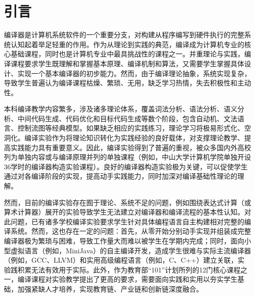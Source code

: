 \documentclass{SCIS2020cn}
\begin{document}
\maketitle

\section{引言}
编译器是计算机系统软件的一个重要分支，对构建从程序编写到硬件执行的完整系统认知起着举足轻重的作用。作为从理论到实践的典范，编译成为计算机专业的核心基础课程，同时也是计算机专业中最具挑战性的课程之一。并重理论与实践，编译课程要求学生既理解和掌握基本原理、编译机制和算法，又需要学生掌握具体设计、实现一个基本编译器的初步能力。然而，由于编译理论抽象，系统实现复杂，导致学生普遍认为编译课程枯燥、繁琐、无用，缺乏学习热情，失去积极性和主动性。

本科编译教学内容繁多，涉及诸多理论体系，覆盖词法分析、语法分析、语义分析、中间代码生成、代码优化和目标代码生成等数个阶段，包含自动机、文法语言、控制流图等经典模型。如果缺乏相应的实践练习，理论学习将极易形式化、空洞化。编译实验作为将理论知识转化为实践经验的良好载体，对支撑理论教学、提高实践能力具有重要意义。因此，编译实验得到了普遍的重视，被众多国内外高校列为单独内容或与编译原理并列的单独课程（例如，中山大学计算机学院单独开设36学时的编译器构造实验课程）。良好的编译器构造实验极为关键，可以促使学生通过对各编译阶段的实现，提高动手实践能力，同时加深对编译基础性理论的理解。

然而，目前的编译实验存在囿于理论、系统不足的问题，例如围绕表达式计算（或算术计算器）展开的实验导致学生无法建立对编译器和编译流程的基本性认知。对此问题，已有诸多学校编译实验要求学生针对具体编程语言自主构建相对完整的编译系统。然而，这也存在一定的问题：首先，从零开始分别动手实现并组装成完整编译器极为繁琐与困难，导致工作量大而难以被学生在学期内完成；同时，面向小型虚拟语言（例如，MiniJava）的自主编译开发，造成学生很难与实际主流编译器（例如，GCC、LLVM）和实用高级编程语言（例如，C、C++）建立关联，实验践积累无法有效用于实际。此外，作为教育部“101”计划\cite{moe21_101}所列的12门核心课程之一，编译课程对实验教学提出了更高的要求，需要面向实践和实用以夯实学生基础，加强紧缺人才培养\cite{moe22_file}，实现教育链、产业链和创新链深度融合\cite{moe21_101}。
\end{document}
